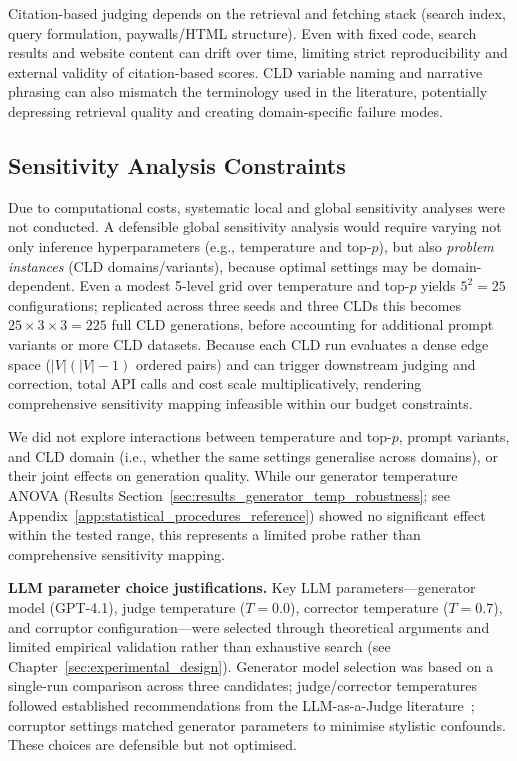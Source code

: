 Citation-based judging depends on the retrieval and fetching stack (search index, query formulation, paywalls/HTML structure). Even with fixed code, search results and website content can drift over time, limiting strict reproducibility and external validity of citation-based scores. CLD variable naming and narrative phrasing can also mismatch the terminology used in the literature, potentially depressing retrieval quality and creating domain-specific failure modes.

\subsection{Sensitivity Analysis Constraints}

Due to computational costs, systematic local and global sensitivity analyses were not conducted. A defensible global sensitivity analysis would require varying not only inference hyperparameters (e.g., temperature and top-$p$), but also \textit{problem instances} (CLD domains/variants), because optimal settings may be domain-dependent. Even a modest 5-level grid over temperature and top-$p$ yields $5^2 = 25$ configurations; replicated across three seeds and three CLDs this becomes $25 \times 3 \times 3 = 225$ full CLD generations, before accounting for additional prompt variants or more CLD datasets. Because each CLD run evaluates a dense edge space ($|V|(|V|-1)$ ordered pairs) and can trigger downstream judging and correction, total API calls and cost scale multiplicatively, rendering comprehensive sensitivity mapping infeasible within our budget constraints.

We did not explore interactions between temperature and top-$p$, prompt variants, and CLD domain (i.e., whether the same settings generalise across domains), or their joint effects on generation quality. While our generator temperature ANOVA (Results Section~\ref{sec:results_generator_temp_robustness}; see Appendix~\ref{app:statistical_procedures_reference}) showed no significant effect within the tested range, this represents a limited probe rather than comprehensive sensitivity mapping.

\textbf{LLM parameter choice justifications.} Key LLM parameters---generator model (GPT-4.1), judge temperature ($T=0.0$), corrector temperature ($T=0.7$), and corruptor configuration---were selected through theoretical arguments and limited empirical validation rather than exhaustive search (see Chapter~\ref{sec:experimental_design}). Generator model selection was based on a single-run comparison across three candidates; judge/corrector temperatures followed established recommendations from the LLM-as-a-Judge literature~\citep{liu2023gevalnlgevaluationusing, zheng2024judging, madaan2023selfrefineiterativerefinementselffeedback}; corruptor settings matched generator parameters to minimise stylistic confounds. These choices are defensible but not optimised.

